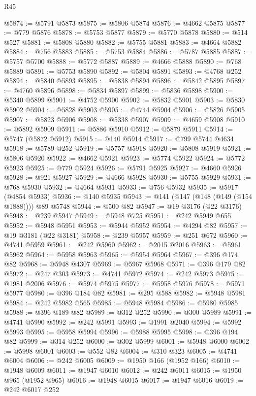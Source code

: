 \begin{lexlean}{R45}
\begin{coremodule}
{@5874 := @5791 @5873
@5875 := @5806 @5874
@5876 := @4662 @5875
@5877 := @779 @5876
@5878 := @5753 @5877
@5879 := @5770 @5878
@5880 := @514 @527
@5881 := @5808 @5880
@5882 := @5755 @5881
@5883 := @4664 @5882
@5884 := @756 @5883
@5885 := @5753 @5884
@5886 := @5787 @5885
@5887 := @5757 @5700
@5888 := @5772 @5887
@5889 := @4666 @5888
@5890 := @768 @5889
@5891 := @5753 @5890
@5892 := @5804 @5891
@5893 := @4768 @252
@5894 := @5840 @5893
@5895 := @5838 @5894
@5896 := @5842 @5895
@5897 := @4760 @5896
@5898 := @5834 @5897
@5899 := @5836 @5898
@5900 := @5340 @5899
@5901 := @4752 @5900
@5902 := @5832 @5901
@5903 := @5830 @5902
@5904 := @5828 @5903
@5905 := @4744 @5904
@5906 := @5826 @5905
@5907 := @5823 @5906
@5908 := @5338 @5907
@5909 := @4659 @5908
@5910 := @5892 @5909
@5911 := @5886 @5910
@5912 := @5879 @5911
@5914 := @5747 (@5872 @5912)
@5915 := @140 @5914
@5917 := @799 @5744 @4634
@5918 := @5789 @252
@5919 := @5757 @5918
@5920 := @5808 @5919
@5921 := @5806 @5920
@5922 := @4662 @5921
@5923 := @5774 @5922
@5924 := @5772 @5923
@5925 := @779 @5924
@5926 := @5791 @5925
@5927 := @4660 @5926
@5928 := @921 @5927
@5929 := @4666 @5928
@5930 := @5755 @5929
@5931 := @768 @5930
@5932 := @4664 @5931
@5933 := @756 @5932
@5935 := @5917 (@4854 @5933)
@5936 := @140 @5935
@5943 := @141 (@147 (@148 (@149 (@154 @1888)))) @89 @5748
@5944 := @500 @82
@5947 := @19 @3176 (@22 @3176)
@5948 := @239 @5947
@5949 := @5948 @725
@5951 := @242 @5949 @655
@5952 := @5948 @5951
@5953 := @5944 @5952
@5954 := @4294 @82
@5957 := @19 @3181 (@22 @3181)
@5958 := @239 @5957
@5959 := @251 @672
@5960 := @4741 @5959
@5961 := @242 @5960
@5962 := @2015 @2016
@5963 := @5961 @5962
@5964 := @5958 @5963
@5965 := @5954 @5964
@5967 := @396 @174 @82
@5968 := @5948 @4307
@5969 := @5967 @5968
@5971 := @396 @179 @82
@5972 := @247 @303
@5973 := @4741 @5972
@5974 := @242 @5973
@5975 := @1981 @2006
@5976 := @5974 @5975
@5977 := @5958 @5976
@5978 := @5971 @5977
@5980 := @396 @184 @82
@5981 := @295 @588
@5982 := @5948 @5981
@5984 := @242 @5982 @565
@5985 := @5948 @5984
@5986 := @5980 @5985
@5988 := @396 @189 @82
@5989 := @312 @252
@5990 := @300 @5989
@5991 := @4741 @5990
@5992 := @242 @5991
@5993 := @1991 @2040
@5994 := @5992 @5993
@5995 := @5958 @5994
@5996 := @5988 @5995
@5998 := @396 @194 @82
@5999 := @314 @252
@6000 := @302 @5999
@6001 := @5948 @6000
@6002 := @5998 @6001
@6003 := @552 @82
@6004 := @310 @323
@6005 := @4741 @6004
@6006 := @242 @6005
@6009 := @1950 @166 (@1952 @166)
@6010 := @1948 @6009
@6011 := @1947 @6010
@6012 := @242 @6011
@6015 := @1950 @965 (@1952 @965)
@6016 := @1948 @6015
@6017 := @1947 @6016
@6019 := @242 @6017 @252
}
\end{coremodule}
\end{lexlean}
